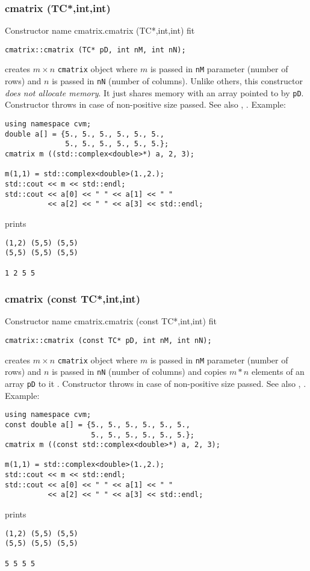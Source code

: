 \subsubsection{cmatrix (TC*,int,int)}
Constructor%
\pdfdest name {cmatrix.cmatrix (TC*,int,int)} fit
\begin{verbatim}
cmatrix::cmatrix (TC* pD, int nM, int nN);
\end{verbatim}
creates  $m\times n$ \verb"cmatrix" object where $m$ is passed in
\verb"nM" parameter (number of rows) and $n$ is passed in
\verb"nN" (number of columns).
Unlike others, this constructor \textit{does not allocate memory}.
It just shares  memory with an array pointed to by \verb"pD".
Constructor throws  
in case of non-positive size passed.
See also , .
Example:
\begin{Verbatim}
using namespace cvm;
double a[] = {5., 5., 5., 5., 5., 5.,
              5., 5., 5., 5., 5., 5.};
cmatrix m ((std::complex<double>*) a, 2, 3);

m(1,1) = std::complex<double>(1.,2.);
std::cout << m << std::endl;
std::cout << a[0] << " " << a[1] << " "
          << a[2] << " " << a[3] << std::endl;
\end{Verbatim}
prints
\begin{Verbatim}
(1,2) (5,5) (5,5)
(5,5) (5,5) (5,5)

1 2 5 5
\end{Verbatim}
\newpage



\subsubsection{cmatrix (const TC*,int,int)}
Constructor%
\pdfdest name {cmatrix.cmatrix (const TC*,int,int)} fit
\begin{verbatim}
cmatrix::cmatrix (const TC* pD, int nM, int nN);
\end{verbatim}
creates  $m\times n$ \verb"cmatrix" object where $m$ is passed in
\verb"nM" parameter (number of rows) and $n$ is passed in
\verb"nN" (number of columns)
and copies $m*n$ elements of an array  \verb"pD" to it .
Constructor throws  
in case of non-positive size passed.
See also , .
Example:
\begin{Verbatim}
using namespace cvm;
const double a[] = {5., 5., 5., 5., 5., 5.,
                    5., 5., 5., 5., 5., 5.};
cmatrix m ((const std::complex<double>*) a, 2, 3);

m(1,1) = std::complex<double>(1.,2.);
std::cout << m << std::endl;
std::cout << a[0] << " " << a[1] << " "
          << a[2] << " " << a[3] << std::endl;
\end{Verbatim}
prints
\begin{Verbatim}
(1,2) (5,5) (5,5)
(5,5) (5,5) (5,5)

5 5 5 5
\end{Verbatim}
\newpage



